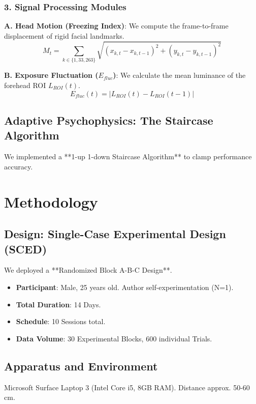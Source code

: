 \documentclass[journal]{IEEEtran}
\begin{document}
\subsubsection{3. Signal Processing Modules}
\textbf{A. Head Motion (Freezing Index)}:
We compute the frame-to-frame displacement of rigid facial landmarks.
\begin{equation}
    M_t = \sum_{k \in \{1, 33, 263\}} \sqrt{(x_{k,t} - x_{k,t-1})^2 + (y_{k,t} - y_{k,t-1})^2}
\end{equation}

\textbf{B. Exposure Fluctuation ($E_{fluc}$)}:
We calculate the mean luminance of the forehead ROI $L_{ROI}(t)$.
\begin{equation}
    E_{fluc}(t) = | L_{ROI}(t) - L_{ROI}(t-1) |
\end{equation}

\subsection{Adaptive Psychophysics: The Staircase Algorithm}
We implemented a **1-up 1-down Staircase Algorithm** to clamp performance accuracy.

\section{Methodology}

\subsection{Design: Single-Case Experimental Design (SCED)}
We deployed a **Randomized Block A-B-C Design**.
\begin{itemize}
    \item \textbf{Participant}: Male, 25 years old. Author self-experimentation (N=1).
    \item \textbf{Total Duration}: 14 Days.
    \item \textbf{Schedule}: 10 Sessions total.
    \item \textbf{Data Volume}: 30 Experimental Blocks, 600 individual Trials.
\end{itemize}

\subsection{Apparatus and Environment}
Microsoft Surface Laptop 3 (Intel Core i5, 8GB RAM). Distance approx. 50-60 cm.
\end{document}
